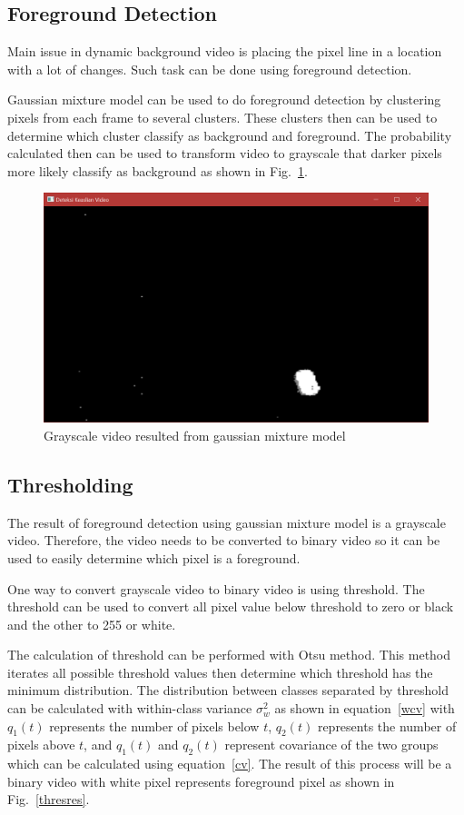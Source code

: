 \documentclass[conference]{IEEEtran}
\begin{document}
\subsection{Foreground Detection}
Main issue in dynamic background video is placing the pixel line in a location with a lot of changes. Such task can be done using foreground detection.

Gaussian mixture model can be used to do foreground detection by clustering pixels from each frame to several clusters. These clusters then can be used to determine which cluster classify as background and foreground. The probability calculated then can be used to transform video to grayscale that darker pixels more likely classify as background as shown in Fig.~\ref{gmmres}.

\begin{figure}[htbp]
\centering
\includegraphics[width=0.9\linewidth]{gmmres.png}
\setlength\intextsep{0pt}
\caption{Grayscale video resulted from gaussian mixture model}
\label{gmmres}
\end{figure}

\subsection{Thresholding}
The result of foreground detection using gaussian mixture model is a grayscale video. Therefore, the video needs to be converted to binary video so it can be used to easily determine which pixel is a foreground.

One way to convert grayscale video to binary video is using threshold. The threshold can be used to convert all pixel value below threshold to zero or black and the other to 255 or white.

The calculation of threshold can be performed with Otsu method. This method iterates all possible threshold values then determine which threshold has the minimum distribution. The distribution between classes separated by threshold can be calculated with within-class variance $\sigma_w^2$ as shown in equation~\ref{wcv} with $q_1(t)$ represents the number of pixels below $t$, $q_2(t)$ represents the number of pixels above $t$, and $q_1(t)$ and $q_2(t)$ represent covariance of the two groups which can be calculated using equation~\ref{cv}. The result of this process will be a binary video with white pixel represents foreground pixel as shown in Fig.~\ref{thresres}.
\end{document}
